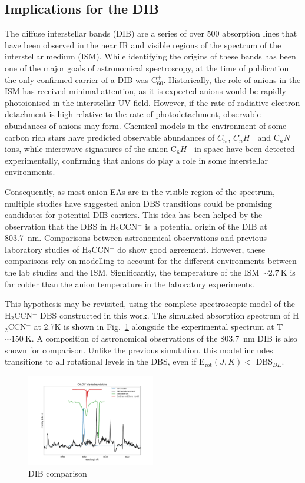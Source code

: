 \documentclass[journal=jpcafh,manuscript=article,layout=onecolumn, 12pt]{achemso}
\begin{document}
\subsection{Implications for the DIB}
The diffuse interstellar bands (DIB) are a series of over 500 absorption lines that have been observed in the near IR and visible regions of the spectrum of the interstellar medium (ISM). While identifying the origins of these bands has been one of the major goals of astronomical spectroscopy, at the time of publication the only confirmed carrier of a DIB was C$_{60}^+$. Historically, the role of anions in the ISM has received minimal attention, as it is expected anions would be rapidly photoionised in the interstellar UV field. However, if the rate of radiative electron detachment is high relative to the rate of photodetachment, observable abundances of anions may form. Chemical models in the environment of some carbon rich stars have predicted observable abundances of $C_n^-$, $C_nH^-$ and C$_nN^-$ ions, while microwave signatures of the anion C$_6H^-$ in space have been detected experimentally, confirming that anions do play a role in some interstellar environments.

Consequently, as most anion EAs are in the visible region of the spectrum, multiple studies have suggested anion DBS transitions could be promising candidates for potential DIB carriers. This idea has been helped by the observation that the DBS in H$_2$CCN$^-$ is a potential origin of the DIB at 803.7~nm. Comparisons between astronomical observations and previous laboratory studies of H$_2$CCN$^-$ do show good agreement. However, these comparisons rely on modelling to account for the different environments between the lab studies and the ISM. Significantly, the temperature of the ISM $\sim2.7~$K is far colder than the anion temperature in the laboratory experiments.

This hypothesis may be revisited, using the complete spectroscopic model of the H$_2$CCN$^-$ DBS constructed in this work. The simulated absorption spectrum of H$_2$CCN$^-$ at 2.7K is shown in Fig.~\ref{fig:DIB} alongside the experimental spectrum at T$\sim150~$K. A composition of astronomical observations of the 803.7~nm DIB is also shown for comparison. Unlike the previous simulation, this model includes transitions to all rotational levels in the DBS, even if E$_{\text{rot}}(J,K)< $ DBS$_{BE}$.

\begin{figure}
	\includegraphics[width=0.5\textwidth]{scripts/DIB}
	\caption{DIB comparison}
	\label{fig:DIB}
\end{figure}
\end{document}
